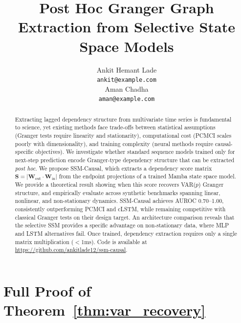 \documentclass{article}
\title{Post Hoc Granger Graph Extraction from Selective State Space Models}
\author{%
  Ankit Hemant Lade \\
  \texttt{ankit@example.com} \\
  \And
  Aman Chadha \\
  \texttt{aman@example.com} \\
}
\newcommand{\bS}{\mathbf{S}}
\newcommand{\bW}{\mathbf{W}}
\newcommand{\methodname}{SSM-Causal}
\begin{document}
\maketitle

\begin{abstract}
Extracting lagged dependency structure from multivariate time series is
fundamental to science, yet existing methods face trade-offs between
statistical assumptions (Granger tests require linearity and stationarity),
computational cost (PCMCI scales poorly with dimensionality), and training
complexity (neural methods require causal-specific objectives). We
investigate whether standard sequence models trained only for next-step
prediction encode Granger-type dependency structure that can be extracted
\emph{post hoc}. We propose \methodname{}, which extracts a dependency
score matrix $\bS = |\bW_{\text{out}} \cdot \bW_{\text{in}}|$ from the
endpoint projections of a trained Mamba state space model. We provide a
theoretical result showing when this score recovers VAR($p$) Granger
structure, and empirically evaluate across synthetic benchmarks spanning
linear, nonlinear, and non-stationary dynamics. \methodname{} achieves
AUROC 0.70--1.00, consistently outperforming PCMCI and cLSTM, while
remaining competitive with classical Granger tests on their design target.
An architecture comparison reveals that the selective SSM provides a
specific advantage on non-stationary data, where MLP and LSTM alternatives
fail. Once trained, dependency extraction requires only a single matrix
multiplication ($<$1ms). Code is available at
\url{https://github.com/ankitlade12/ssm-causal}.
\end{abstract}





\appendix

\section{Full Proof of Theorem~\ref{thm:var_recovery}}
\label{app:proofs}

\end{document}
